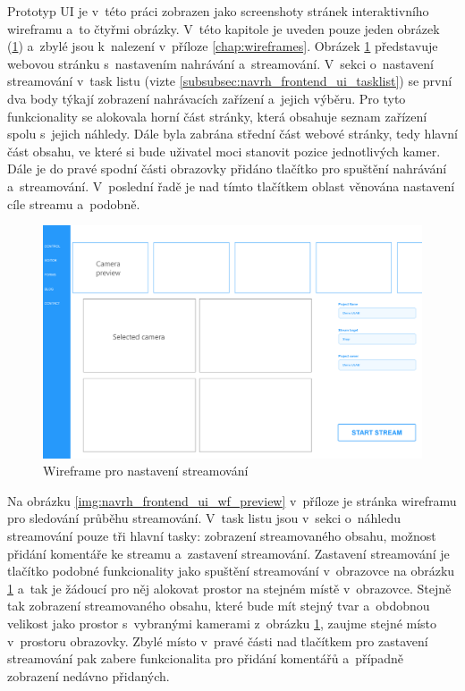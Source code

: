 \documentclass[thesis=M,czech]{FITthesis}[2012/06/26]
\begin{document}
	Prototyp UI je v~této práci zobrazen jako screenshoty stránek interaktivního wireframu a~to čtyřmi obrázky. V~této kapitole je uveden pouze jeden obrázek (\ref{img:navrh_frontend_ui_wf_config}) a~zbylé jsou k~nalezení v~příloze \ref{chap:wireframes}. Obrázek \ref{img:navrh_frontend_ui_wf_config} představuje webovou stránku s~nastavením nahrávání a~streamování. V~sekci o~nastavení streamování v~task listu (vizte \ref{subsubsec:navrh_frontend_ui_tasklist}) se první dva body týkají zobrazení nahrávacích zařízení a~jejich výběru. Pro tyto funkcionality se alokovala horní část stránky, která obsahuje seznam zařízení spolu s~jejich náhledy. Dále byla zabrána střední část webové stránky, tedy hlavní část obsahu, ve které si bude uživatel moci stanovit pozice jednotlivých kamer. Dále je do pravé spodní části obrazovky přidáno tlačítko pro spuštění nahrávání a~streamování. V~poslední řadě je nad tímto tlačítkem oblast věnována nastavení cíle streamu a~podobně.
	
\begin{figure}\centering
	\includegraphics[width=1\paperwidth, angle=90]{images/ui_wf_test.eps}
	\caption{Wireframe pro nastavení streamování}\label{img:navrh_frontend_ui_wf_config}
\end{figure}

Na obrázku \ref{img:navrh_frontend_ui_wf_preview} v~příloze je stránka wireframu pro sledování průběhu streamování. V~task listu jsou v~sekci o~náhledu streamování pouze tři hlavní tasky: zobrazení streamovaného obsahu, možnost přidání komentáře ke streamu a~zastavení streamování. Zastavení streamování je tlačítko podobné funkcionality jako spuštění streamování v~obrazovce na obrázku \ref{img:navrh_frontend_ui_wf_config} a~tak je žádoucí pro něj alokovat prostor na stejném místě v~obrazovce. Stejně tak zobrazení streamovaného obsahu, které bude mít stejný tvar a~obdobnou velikost jako prostor s~vybranými kamerami z~obrázku \ref{img:navrh_frontend_ui_wf_config}, zaujme stejné místo v~prostoru obrazovky. Zbylé místo v~pravé části nad tlačítkem pro zastavení streamování pak zabere funkcionalita pro přidání komentářů a~případně zobrazení nedávno přidaných. 
\end{document}
